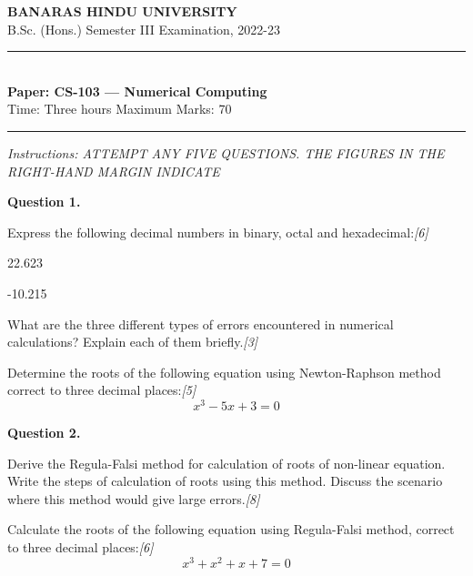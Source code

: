 \documentclass[11pt,a4paper]{article}
\newcommand{\pts}[1]{\hfill   \textit{[#1]}}
\begin{document}
\begin{center}
  {\large\bfseries BANARAS HINDU UNIVERSITY}\\[2pt]
  {\normalsize B.Sc. (Hons.) Semester III Examination, 2022-23}\\[6pt]
  \rule{0.8\linewidth}{0.5pt}\\[6pt]
  {\large\bfseries Paper: CS-103 --- Numerical Computing}\\[4pt]
  {\normalsize Time: Three hours \hfill Maximum Marks: 70}
\end{center}

\rule{\linewidth}{0.4pt}

\smallskip



\noindent   \textit{Instructions: ATTEMPT ANY FIVE QUESTIONS. THE FIGURES IN THE RIGHT-HAND MARGIN INDICATE}

\bigskip

\medskip


\noindent   \textbf{Question 1.}

\begin{parts}
  \item Express the following decimal numbers in binary, octal and hexadecimal:\pts{6}
  
\begin{parts}
    \item 22.623
    \item -10.215
  \end{parts}
  \item What are the three different types of errors encountered in numerical calculations? Explain each of them briefly.\pts{3}
  \item Determine the roots of the following equation using Newton-Raphson method correct to three decimal places:\pts{5}
  \[ x^3 - 5x + 3 = 0 \]
\end{parts}

\medskip


\noindent   \textbf{Question 2.}

\begin{parts}
  \item Derive the Regula-Falsi method for calculation of roots of non-linear equation. Write the steps of calculation of roots using this method. Discuss the scenario where this method would give large errors.\pts{8}
  \item Calculate the roots of the following equation using Regula-Falsi method, correct to three decimal places:\pts{6}
  \[ x^3 + x^2 + x + 7 = 0 \]
\end{parts}
\end{document}
